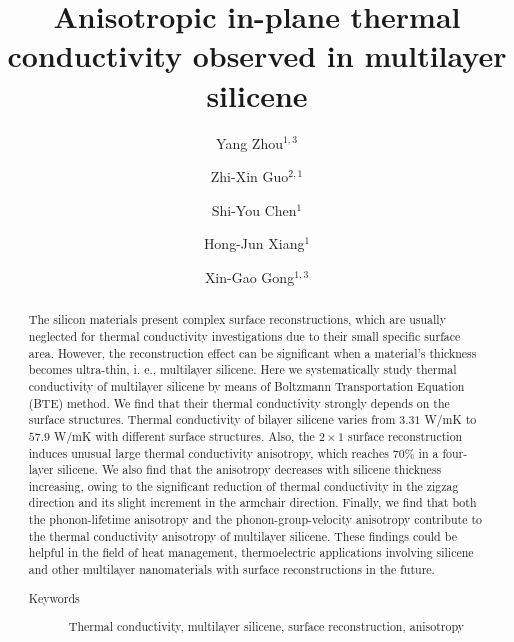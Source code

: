 \documentclass[aps,prb,twocolumn,showpacs,amsmath,amssymb]{revtex4-1}
\begin{document}
\title{Anisotropic in-plane thermal conductivity observed in multilayer silicene}
\author{Yang Zhou${}^{1,3}$}
\author{Zhi-Xin Guo${}^{2,1}$}
\author{Shi-You Chen${}^{1}$}
\author{Hong-Jun Xiang${}^{1}$}
\author{Xin-Gao Gong${}^{1,3}$}
\begin{abstract}
  The silicon materials present complex surface reconstructions, which are usually neglected for thermal conductivity investigations due to their small specific surface area. However, the reconstruction effect can be significant when a material's thickness becomes ultra-thin, i. e., multilayer silicene. Here we systematically study thermal conductivity of multilayer silicene by means of Boltzmann Transportation Equation (BTE) method.  We find that their thermal conductivity strongly depends on the surface structures. Thermal conductivity of bilayer silicene varies from $3.31$ W/mK to $57.9$ W/mK with different surface structures. Also, the $2\times1$ surface reconstruction induces unusual large thermal conductivity anisotropy, which reaches 70\%  in a four-layer silicene.  We also find that the anisotropy decreases with silicene thickness increasing, owing to the significant reduction of thermal conductivity in the zigzag direction and its slight increment  in the armchair direction.
  Finally, we find that both the phonon-lifetime anisotropy and the phonon-group-velocity  anisotropy contribute to the thermal conductivity anisotropy of multilayer silicene.
  These findings could be helpful in the field of heat management, thermoelectric applications involving silicene and other multilayer nanomaterials  with surface reconstructions in the future.

  \begin{description}
    \item[Keywords]
          Thermal conductivity, multilayer silicene, surface reconstruction, anisotropy
  \end{description}
\end{abstract}

\maketitle
\end{document}
